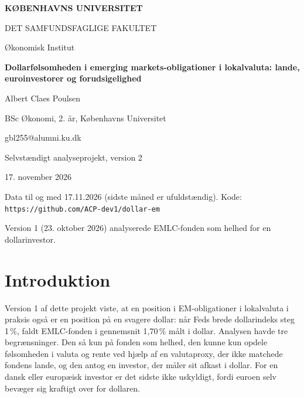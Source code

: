 \documentclass[11pt,a4paper]{article}
\begin{document}
\begin{titlepage}
\centering
\vspace*{2.2cm}
{\large\bfseries KØBENHAVNS UNIVERSITET\par}
\vspace{0.3cm}
{\normalsize DET SAMFUNDSFAGLIGE FAKULTET\par}
{\normalsize Økonomisk Institut\par}
\vspace{3.2cm}
{\LARGE\bfseries Dollarfølsomheden i emerging markets-obligationer i lokalvaluta: lande, euroinvestorer og forudsigelighed\par}
\vspace{2.2cm}
{\large Albert Claes Poulsen\par}
\vspace{0.4cm}
{BSc Økonomi, 2. år, Københavns Universitet\par}
{gbl255@alumni.ku.dk\par}
\vspace{1.4cm}
{Selvstændigt analyseprojekt, version 2\par}
{17. november 2026\par}
\vfill
{\small Data til og med 17.11.2026 (sidste måned er ufuldstændig). Kode: \texttt{https://github.com/ACP-dev1/dollar-em}\par}
\small Version 1 (23. oktober 2026) analyserede EMLC-fonden som helhed for en dollarinvestor.\par
\end{titlepage}

\tableofcontents
\newpage

\section*{Introduktion}

Version 1 af dette projekt viste, at en position i EM-obligationer i lokalvaluta i praksis også er en position på en svagere dollar: når Feds brede dollarindeks steg 1\,\%, faldt EMLC-fonden i gennemsnit 1,70\,\% målt i dollar. Analysen havde tre begrænsninger. Den så kun på fonden som helhed, den kunne kun opdele følsomheden i valuta og rente ved hjælp af en valutaproxy, der ikke matchede fondens lande, og den antog en investor, der måler sit afkast i dollar. For en dansk eller europæisk investor er det sidste ikke uskyldigt, fordi euroen selv bevæger sig kraftigt over for dollaren.
\end{document}
